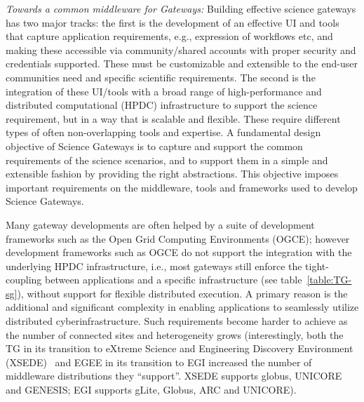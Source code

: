 \documentclass[]{svjour3}
\begin{document}
{\it Towards a common middleware for Gateways:} Building effective
science gateways has two major tracks: the first is the development of
an effective UI and tools that capture application requirements, e.g.,
expression of workflows etc, and making these accessible via
community/shared accounts with proper security and credentials
supported. These must be customizable and extensible to the end-user
communities need and specific scientific requirements. The second is
the integration of these UI/tools with a broad range of
high-performance and distributed computational (HPDC) infrastructure
to support the science requirement, but in a way that is scalable and
flexible.  These require different types of often non-overlapping
tools and expertise.  A fundamental design objective of Science
Gateways is to capture and support the common requirements of the
science scenarios, and to support them in a simple and extensible
fashion by providing the right abstractions.  This objective imposes
important %
requirements on the middleware, tools and frameworks used to develop
Science Gateways.

Many gateway developments are often helped by a suite of development
frameworks such as the Open Grid Computing
Environments\cite{ogce-2010} (OGCE); however development frameworks
such as OGCE do not support the integration with the underlying HPDC
infrastructure, i.e., most gateways still enforce the tight-coupling
between applications and a specific infrastructure (see
table~\ref{table:TG-sg}), without support for flexible distributed
execution.  A primary reason is the additional and significant
complexity in %
enabling applications to seamlessly utilize distributed
cyberinfrastructure. Such requirements become harder to achieve as the
number of connected sites and heterogeneity grows (interestingly, both
the TG in its transition to eXtreme Science and Engineering Discovery
Environment (XSEDE)~\cite{XSEDE} and EGEE in its transition to EGI
increased the number of middleware distributions they ``support''.
XSEDE supports globus, UNICORE and GENESIS; EGI supports gLite,
Globus, ARC and UNICORE).


\end{document}
